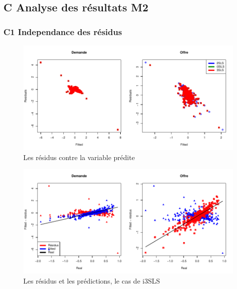 \documentclass[11pt,]{article}
\begin{document}
\FloatBarrier

\newpage

\hypertarget{c-analyse-des-resultats-m2}{%
\subsection{C Analyse des résultats
M2}\label{c-analyse-des-resultats-m2}}

\hypertarget{c1-independance-des-residus}{%
\subsubsection{C1 Independance des
résidus}\label{c1-independance-des-residus}}

\FloatBarrier

\FloatBarrier

\FloatBarrier

\begin{figure}[!htbp]

{\centering \includegraphics{note2pres_files/figure-latex/unnamed-chunk-73-1} 

}

\caption{Les résidus contre la variable prédite}\label{fig:unnamed-chunk-73}
\end{figure}

\FloatBarrier

\FloatBarrier

\begin{figure}[!htbp]

{\centering \includegraphics{note2pres_files/figure-latex/unnamed-chunk-74-1} 

}

\caption{Les résidus et les prédictions, le cas de i3SLS}\label{fig:unnamed-chunk-74}
\end{figure}
\end{document}
